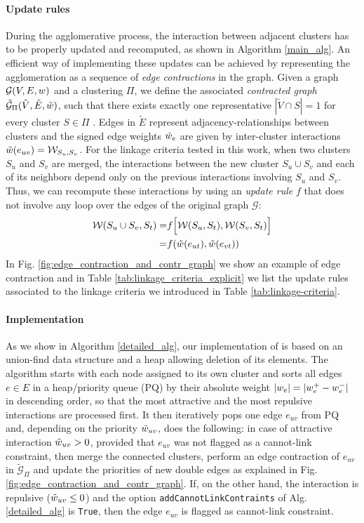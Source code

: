 \paragraph*{Update rules} During the agglomerative process, the interaction between adjacent clusters has to be properly updated and recomputed, as shown in Algorithm \ref{main_alg}.  
An efficient way of implementing these updates can be achieved by representing the agglomeration as a sequence of \emph{edge contractions} in the graph. Given a graph $\mathcal{G}(V,E,w)$ and a clustering $\Pi$, we define the associated \emph{contracted graph} $\tilde{\mathcal{G}}_\Pi(\tilde{V}, \tilde{E}, \tilde{w})$, such that there exists exactly one representative $|\tilde{V} \cap S| = 1$ for every cluster $S \in \Pi$ . Edges in $\tilde{E}$ represent adjacency-relationships between clusters 
and the signed edge weights $\tilde{w}_e$ are given by inter-cluster interactions $\tilde{w}(e_{uv})=\mathcal{W}_{S_u,S_v}$. 
For the linkage criteria tested in this work, when two clusters $S_u$ and $S_v$ are merged, the interactions between the new cluster $S_u \cup S_v$ and each of its neighbors depend only on the previous interactions involving $S_u$ and $S_v$. Thus, we can recompute these interactions by using an \emph{update rule} $f$ that does not involve any loop over the edges of the original graph $\mathcal{G}$:
\begin{align}
  \mathcal{W}(S_u \cup S_v,S_t) =& f\Big[ \mathcal{W}(S_u,S_t), \mathcal{W}(S_v,S_t) \Big] \\
  =& f(\tilde{w}(e_{ut}), \tilde{w}(e_{vt})) 
\end{align}
In Fig. \ref{fig:edge_contraction_and_contr_graph} we show an example of edge contraction and in Table \ref{tab:linkage_criteria_explicit} we list the update rules associated to the linkage criteria we introduced in Table \ref{tab:linkage-criteria}.


\paragraph{Implementation} As we show in Algorithm \ref{detailed_alg}, our implementation of \algname{} is based on an union-find data structure and a heap allowing deletion of its elements. The algorithm starts with each node assigned to its own cluster and sorts all edges $e\in E$ in a heap/priority queue (PQ) by their absolute weight $|w_e|=|w_e^+ - w_e^-|$ in descending order, so that the most attractive and the most repulsive interactions are processed first. It then iteratively pops one edge $e_{uv}$ from PQ and, depending on the priority $\tilde{w}_{uv}$, does the following: in case of attractive interaction $\tilde{w}_{uv}>0$, provided that $e_{uv}$ was not flagged as a cannot-link constraint, then merge the connected clusters, perform an edge contraction of $e_{uv}$ in $\tilde{\mathcal{G}}_\Pi$ and update the priorities of new double edges as explained in Fig. \ref{fig:edge_contraction_and_contr_graph}. 
If, on the other hand, the interaction is repulsive ($\tilde{w}_{uv}\leq 0$) and the option \texttt{addCannotLinkContraints} of Alg. \ref{detailed_alg} is \texttt{True}, then the edge $e_{uv}$ is flagged as cannot-link constraint.




